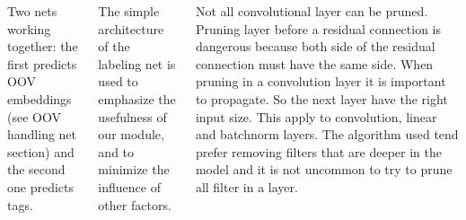 \documentclass[25pt, a0paper,
               colspace=15mm, subcolspace=0mm,
               blockverticalspace=17mm,
               landscape]{tikzposter} %
\begin{document}
\begin{columns}
{  Two nets working together: the first predicts OOV embeddings (see OOV handling net section) and the second one predicts tags.

  The simple architecture of the labeling net is used to emphasize the usefulness of our module, and to minimize the influence of other factors.

  \vspace{-.5mm}

  }









  {
   Not all convolutional layer can be pruned. Pruning layer before a residual connection is dangerous because both side of the residual connection must have the same side.
  \newline
  When pruning in a convolution layer it is important to propagate. So the next layer have the right input size. This apply to convolution, linear and batchnorm layers.
  \newline
  The algorithm used tend prefer removing filters that are deeper in the model and it is not uncommon to try to prune all filter in a layer.
  \newline
  }







  
  
  
  




\end{columns}
\end{document}
